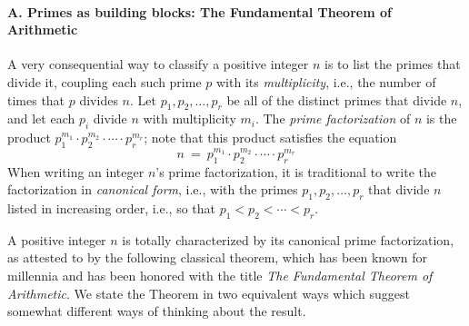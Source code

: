   
\paragraph{\small\sf A. Primes as building blocks: The Fundamental Theorem of Arithmetic}

A very consequential way to classify a positive integer $n$ is to list
the primes that divide it, coupling each such prime $p$ with its {\it
  multiplicity}, i.e., the number of times that $p$ divides $n$.  Let
$p_1, p_2, \ldots, p_r$ be all of the distinct primes that divide $n$,
and let each $p_i$ divide $n$ with multiplicity $m_i$.  The {\it prime
  factorization}   
of $n$ is the product $p_1^{m_1} \cdot p_2^{m_2} \cdot \cdots \cdot
p_r^{m_r}$; note that this product satisfies the equation
\begin{equation}
\label{eq:prime-factorization}
n \ = \ p_1^{m_1} \cdot p_2^{m_2} \cdot \cdots \cdot p_r^{m_r}
\end{equation}
When writing an integer $n$'s prime factorization, it is traditional
to write the factorization in {\it canonical form},
i.e., with the primes $p_1, p_2, \ldots, p_r$ that divide $n$ listed
in increasing order, i.e., so that $p_1 < p_2 < \cdots < p_r$.

A positive integer $n$ is totally characterized by its canonical prime
factorization, as attested to by the following classical theorem,
which has been known for millennia and has been honored with the title
{\em The Fundamental Theorem of Arithmetic}.
We state the Theorem in two equivalent ways which suggest somewhat
different ways of thinking about the result.

